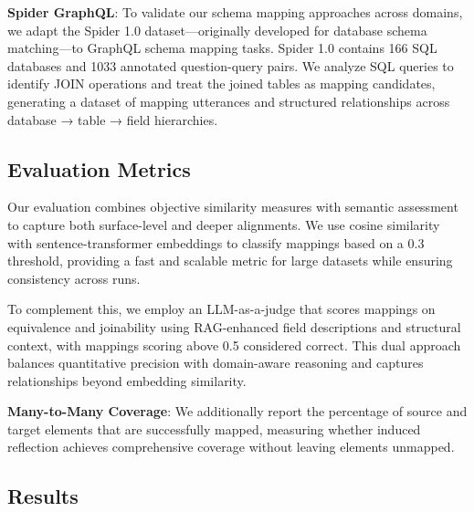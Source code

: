\documentclass[sigconf, nonacm]{acmart}
\newcommand{\deleted}[1]{\textcolor{red}{#1}}
\begin{document}
\textbf{Spider GraphQL}: To validate our schema mapping approaches across domains, we adapt the Spider 1.0 dataset—originally developed for database schema matching—to GraphQL schema mapping tasks. Spider 1.0 contains 166 SQL databases and 1033 annotated question-query pairs. We analyze SQL queries to identify JOIN operations and treat the joined tables as mapping candidates, generating a dataset of mapping utterances and structured relationships across database → table → field hierarchies.


\subsection{Evaluation Metrics}

Our evaluation combines objective similarity measures with semantic assessment to capture both surface-level and deeper alignments. We use cosine similarity with sentence-transformer embeddings to classify mappings based on a 0.3 threshold, providing a fast and scalable metric for large datasets while ensuring consistency across runs.

To complement this, we employ an LLM-as-a-judge that scores mappings on equivalence and joinability using RAG-enhanced field descriptions and structural context, with mappings scoring above 0.5 considered correct. This dual approach balances quantitative precision with domain-aware reasoning and captures relationships beyond embedding similarity.

\textbf{Many-to-Many Coverage}: We additionally report the percentage of source and target elements that are successfully mapped, measuring whether induced reflection achieves comprehensive coverage without leaving elements unmapped.


\subsection{Results}
\end{document}
